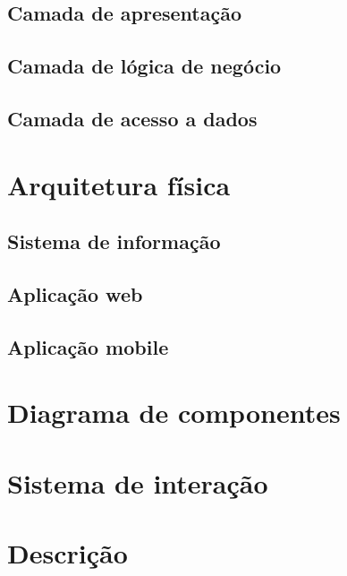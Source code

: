\subsection{Camada de apresentação}


\subsection{Camada de lógica de negócio}



\subsection{Camada de acesso a dados}




\section{Arquitetura física}


\subsection{Sistema de informação}

\subsection{Aplicação web}


\subsection{Aplicação mobile}





\section{Diagrama de componentes}




\section{Sistema de interação}


\section{Descrição}


